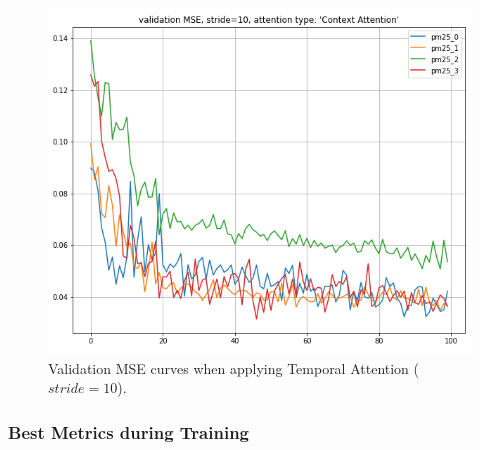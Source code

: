 \documentclass[sigconf]{acmart}
\begin{document}
\begin{figure}[!htbp]
    \centering
    \includegraphics[width=0.8\linewidth]{fig/results/validation/val_mse_myattention.png}
    \caption{Validation MSE curves when applying Temporal Attention ($stride=10$).}
    \label{fig:val_mse_myattention}
\end{figure}


\subsubsection{Best Metrics during Training}
\end{document}
